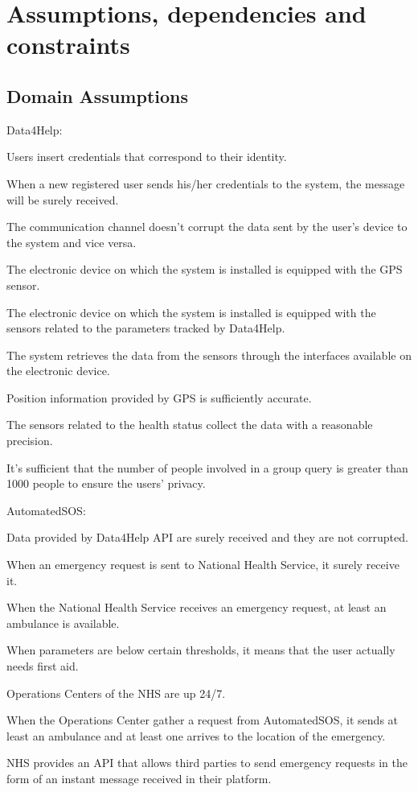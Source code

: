 \section{Assumptions, dependencies and constraints}
\subsection{Domain Assumptions}
Data4Help:  
\begin{enumerate} [label={[D\arabic*]}]
    \item Users insert credentials that correspond to their identity.
    \item When a new registered user sends his/her credentials to the system, the message will be surely received.
    \item The communication channel doesn't corrupt the data sent by the user's device to the system and vice versa.
    \item The electronic device on which the system is installed is equipped with the GPS sensor.
    \item The electronic device on which the system is installed is equipped with the sensors related to the parameters tracked by Data4Help.
    \item The system retrieves the data from the sensors through the interfaces available on the electronic device.
    \item Position information provided by GPS is sufficiently accurate\cite{gps}.
    \item The sensors related to the health status collect the data with a reasonable precision.
    \item It's sufficient that the number of people involved in a group query is greater than 1000 people to ensure the users' privacy.
\end{enumerate}  
\noindent
AutomatedSOS:
\begin{enumerate} [resume, label={[D\arabic*]}]
    \item Data provided by Data4Help API are surely received and they are not corrupted.
    \item When an emergency request is sent to National Health Service, it surely receive it.
    \item When the National Health Service receives an emergency request, at least an ambulance is available.
    \item When parameters are below certain thresholds, it means that the user actually needs first aid.
    \item Operations Centers of the NHS are up 24/7.
    \item When the Operations Center gather a request from AutomatedSOS, it sends at least an ambulance and at least one arrives to the location of the emergency.
    \item NHS provides an API that allows third parties to send emergency requests in the form of an instant message received in their platform.
\end{enumerate}